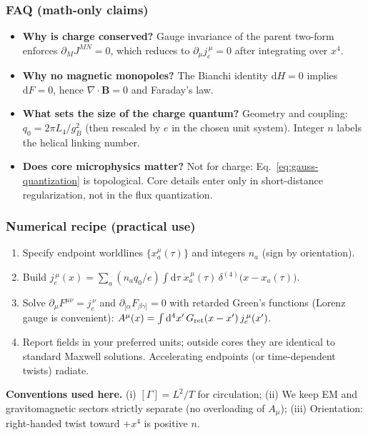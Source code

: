 \subsubsection{FAQ (math-only claims)}
\begin{itemize}
  \item \textbf{Why is charge conserved?} Gauge invariance of the parent two-form enforces $\partial_M J^{MN} = 0$, which reduces to $\partial_\mu j_e^{\,\mu}=0$ after integrating over $x^4$.
  \item \textbf{Why no magnetic monopoles?} The Bianchi identity $\mathrm dH=0$ implies $\mathrm dF=0$, hence $\nabla\!\cdot\!\mathbf B=0$ and Faraday's law.
  \item \textbf{What sets the size of the charge quantum?} Geometry and coupling: $q_0=2\pi L_4/g_B^{2}$ (then rescaled by $e$ in the chosen unit system). Integer $n$ labels the helical linking number.
  \item \textbf{Does core microphysics matter?} Not for charge: Eq.~\eqref{eq:gauss-quantization} is topological. Core details enter only in short-distance regularization, not in the flux quantization.
\end{itemize}

\subsubsection{Numerical recipe (practical use)}
\begin{enumerate}
  \item Specify endpoint worldlines $\{x_a^\mu(\tau)\}$ and integers $n_a$ (sign by orientation).
  \item Build $j_e^{\,\mu}(x)=\sum_a (n_a q_0/e)\int \!\mathrm d\tau\; \dot x_a^{\,\mu}(\tau)\,\delta^{(4)}\big(x-x_a(\tau)\big)$.
  \item Solve $\partial_\mu F^{\mu\nu}= j_e^{\,\nu}$ and $\partial_{[\alpha}F_{\beta\gamma]}=0$ with retarded Green's functions (Lorenz gauge is convenient): $A^\mu(x)=\int \mathrm d^4x'\, G_{\rm ret}(x-x')\, j_e^{\,\mu}(x')$.
  \item Report fields in your preferred units; outside cores they are identical to standard Maxwell solutions. Accelerating endpoints (or time-dependent twists) radiate.
\end{enumerate}

\begin{tcolorbox}
\textbf{Conventions used here.} (i) $[\Gamma]=L^2/T$ for circulation; (ii) We keep EM and gravitomagnetic sectors strictly separate (no overloading of $A_\mu$); (iii) Orientation: right-handed twist toward $+x^4$ is positive $n$.
\end{tcolorbox}


